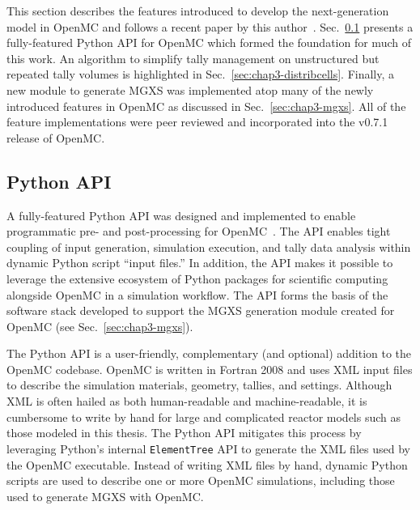 

This section describes the features introduced to develop the next-generation model in OpenMC and follows a recent paper by this author~\cite{boyd2016bigdata}. Sec.~\ref{sec:chap3-py-api} presents a fully-featured Python \ac{API} for OpenMC which formed the foundation for much of this work. An algorithm to simplify tally management on unstructured but repeated tally volumes is highlighted in Sec.~\ref{sec:chap3-distribcells}. Finally, a new module to generate \ac{MGXS} was implemented atop many of the newly introduced features in OpenMC as discussed in Sec.~\ref{sec:chap3-mgxs}. All of the feature implementations were peer reviewed and incorporated into the v0.7.1 release of OpenMC.

\subsection{Python API}
\label{sec:chap3-py-api}

A fully-featured Python \ac{API} was designed and implemented to enable programmatic pre- and post-processing for OpenMC~\cite{boyd2016bigdata}. The \ac{API} enables tight coupling of input generation, simulation execution, and tally data analysis within dynamic Python script ``input files.'' In addition, the \ac{API} makes it possible to leverage the extensive ecosystem of Python packages for scientific computing alongside OpenMC in a simulation workflow. The \ac{API} forms the basis of the software stack developed to support the \ac{MGXS} generation module created for OpenMC (see Sec.~\ref{sec:chap3-mgxs}).


The Python \ac{API} is a user-friendly, complementary (and optional) addition to the OpenMC codebase. OpenMC is written in Fortran 2008 and uses \ac{XML} input files to describe the simulation materials, geometry, tallies, and settings. Although \ac{XML} is often hailed as both human-readable and machine-readable, it is cumbersome to write by hand for large and complicated reactor models such as those modeled in this thesis. The Python \ac{API} mitigates this process by leveraging Python's internal \texttt{ElementTree} \ac{API} to generate the \ac{XML} files used by the OpenMC executable. Instead of writing \ac{XML} files by hand, dynamic Python scripts are used to describe one or more OpenMC simulations, including those used to generate \ac{MGXS} with OpenMC.

